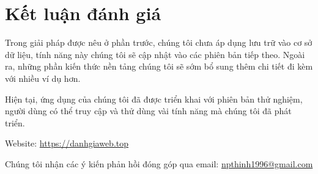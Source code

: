 \chapter{Kết luận đánh giá}
Trong giải pháp được nêu ở phần trước, chúng tôi chưa áp dụng lưu trữ vào cơ sở dữ liệu, tính năng này chúng tôi sẽ cập nhật vào các phiên bản tiếp theo. Ngoài ra, những phần kiến thức nền tảng chúng tôi sẽ sớm bổ sung thêm chi tiết đi kèm với nhiều ví dụ hơn.
\par
Hiện tại, ứng dụng của chúng tôi đã được triển khai với phiên bản thử nghiệm, người dùng có thể truy cập và thử dùng vài tính năng mà chúng tôi đã phát triển.
\par
Website: \url{https://danhgiaweb.top}
\par
Chúng tôi nhận các ý kiến phản hồi đóng góp qua email: \href{mailto:npthinh1996@gmail.com}{npthinh1996@gmail.com}
